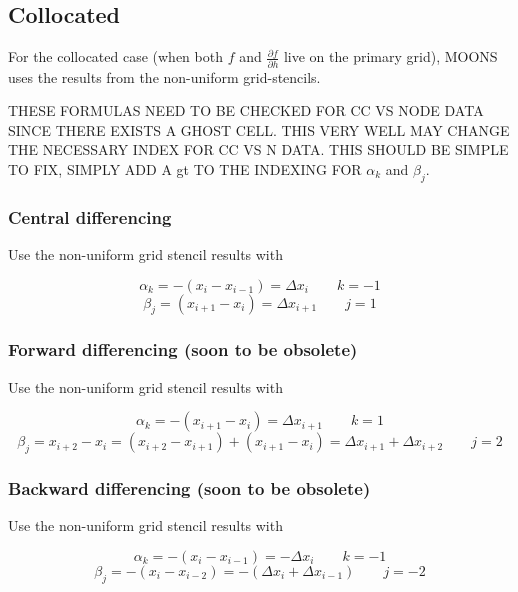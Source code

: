 \documentclass[11pt]{article}
\begin{document}
\subsection{Collocated}
For the collocated case (when both $f$ and $\frac{\partial f}{\partial h}$ live on the primary grid), MOONS uses the results from the non-uniform grid-stencils. 

THESE FORMULAS NEED TO BE CHECKED FOR CC VS NODE DATA SINCE THERE EXISTS A GHOST CELL. THIS VERY WELL MAY CHANGE THE NECESSARY INDEX FOR CC VS N DATA. THIS SHOULD BE SIMPLE TO FIX, SIMPLY ADD A gt TO THE INDEXING FOR $\alpha_k$ and $\beta_j$.

\subsubsection{Central differencing}

Use the non-uniform grid stencil results with

\begin{equation}
	\alpha_k = -(x_{i} - x_{i-1}) = \Delta x_{i} \qquad k = -1
\end{equation}
\begin{equation}
	\beta_j = (x_{i+1} - x_{i}) = \Delta x_{i+1} \qquad j = 1
\end{equation}


\subsubsection{Forward differencing (soon to be obsolete)}

Use the non-uniform grid stencil results with

\begin{equation}
	\alpha_k = -(x_{i+1} - x_{i}) = \Delta x_{i+1} \qquad k = 1
\end{equation}
\begin{equation}
	\beta_j = x_{i+2} - x_{i} = (x_{i+2} - x_{i+1}) + (x_{i+1} - x_{i}) = \Delta x_{i+1} + \Delta x_{i+2} \qquad j = 2
\end{equation}

\subsubsection{Backward differencing (soon to be obsolete)}

Use the non-uniform grid stencil results with

\begin{equation}
	\alpha_k = -(x_{i} - x_{i-1}) = -\Delta x_{i} \qquad k = -1
\end{equation}
\begin{equation}
	\beta_j = -(x_{i} - x_{i-2}) = -(\Delta x_{i} + \Delta x_{i-1}) \qquad j = -2
\end{equation}
\end{document}

